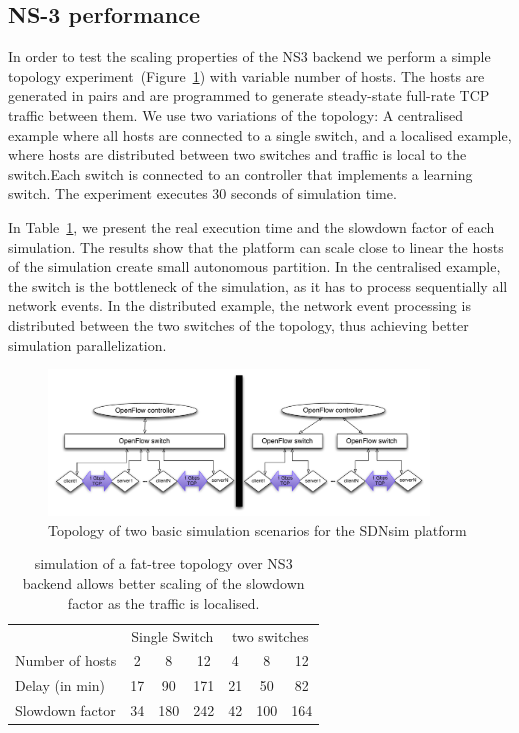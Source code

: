 \subsection{NS-3 performance} \label{sec:sdnsim-ns3-perf}

In order to test the scaling properties of the NS3 backend we perform a simple
topology experiment~(Figure~\ref{Haris-Fig2}) with variable number of hosts.
The hosts are generated in pairs and are programmed to generate steady-state
full-rate TCP traffic between them.  We use two variations of the topology: A
centralised example where all hosts are  connected to a single switch, and a
localised example, where hosts are distributed between two switches and traffic
is local to the switch.Each switch is connected to an \of controller that
implements a learning switch. The experiment executes 30 seconds of simulation
time.

In Table~\ref{Haris-Table1}, we present the real execution time and the slowdown
factor of each simulation.  The results show that the platform can scale close
to linear the hosts of the simulation create small autonomous partition. In the
centralised example, the \of switch is the bottleneck of the simulation, as it
has to process sequentially all network events. In the distributed example, the
network event processing is distributed between the two switches of the
topology, thus achieving better simulation parallelization.

\begin{figure}
\includegraphics[width=0.9\textwidth]{sdnsim-topology}
\caption{Topology of two basic simulation scenarios for the SDNsim platform}
\label{Haris-Fig2}
\end{figure}

\begin{table}
\label{Haris-Table1}
\begin{center}
\begin{tabular}{|l|c|c|c|c|c|c|} \hline
&\multicolumn{3}{|c|}{Single Switch} & \multicolumn{3}{|c|}{two switches} \\
\cline{2-7}
Number of hosts & 2 & 8 & 12 & 4 & 8 & 12 \\
\hline 
Delay (in min) & 17 & 90 & 171 & 21 &50 & 82 \\
\hline
Slowdown factor & 34 & 180 & 242 & 42 & 100 & 164 \\
\hline 
\end{tabular}
\end{center}
\caption{\sdnsim simulation of a fat-tree topology over NS3 backend allows
  better scaling of the slowdown factor as the traffic is localised. }
\end{table}

